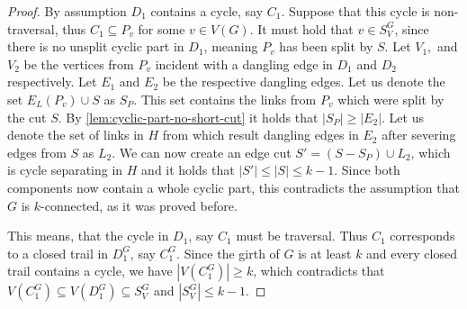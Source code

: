 \documentclass[12pt, twoside]{book}
\begin{document}
\begin{proof}
	By assumption $D_1$ contains a cycle, say $C_1$. Suppose that this cycle is non-traversal, thus $C_1\subseteq P_v$ for some $v\in V(G)$. It must hold that $v\in S_V^G$, since there is no unsplit cyclic part in $D_1$, meaning $P_v$ has been split by $S$. Let $V_1,$ and $V_2$ be the vertices from $P_v$ incident with a dangling edge in $D_1$ and $D_2$ respectively. Let $E_1$ and $E_2$ be the respective dangling edges. Let us denote the set $E_L(P_v)\cup S$ as $S_P$. This set contains the links from $P_v$ which were split by the cut $S$. By \cref{lem:cyclic-part-no-short-cut} it holds that $|S_P|\geq|E_2|$. Let us denote the set of links in $H$ from which result dangling edges in $E_2$ after severing edges from $S$ as $L_2$. We can now create an edge cut $S'=(S-S_P)\cup L_2$, which is cycle separating in $H$ and it holds that $|S'|\leq |S|\leq k-1$. Since both components now contain a whole cyclic part, this contradicts the assumption that $G$ is $k$-connected, as it was proved before.
	
	This means, that the cycle in $D_1$, say $C_1$ must be traversal. Thus $C_1$ corresponds to a closed trail in $D_1^G$, say $C_1^G$. Since the girth of $G$ is at least $k$ and every closed trail contains a cycle, we have $|V(C_1^G)|\geq k$, which contradicts that $V(C_1^G)\subseteq V(D_1^G)\subseteq S_V^G$ and $|S_V^G|\leq k-1$.
	
\end{proof}

\newpage
\thispagestyle{empty}




\end{document}

